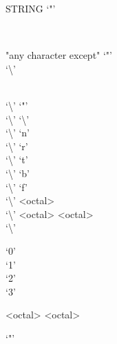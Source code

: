 \documentclass[convert={outext=.png}]{standalone}
\begin{document}
\begin{málrit}{STRING}
	`"'
	\begin{stack}\\
		\begin{rep}
			\begin{stack}
				\begin{stack}
					"any character except" `"'\\
					`\textbackslash '
				\end{stack}\\
				`\textbackslash ' `"'\\
				`\textbackslash ' `\textbackslash '\\
				`\textbackslash ' `n'\\
				`\textbackslash ' `r'\\
				`\textbackslash ' `t'\\
				`\textbackslash ' `b'\\
				`\textbackslash ' `f'\\
				`\textbackslash ' <octal>\\
				`\textbackslash ' <octal> <octal>\\
				`\textbackslash '
				\begin{stack}
					`0'\\
					`1'\\
					`2'\\
					`3'
				\end{stack}
				<octal> <octal>
			\end{stack}
		\end{rep}
	\end{stack}
	`"'
\end{málrit}
\end{document}
